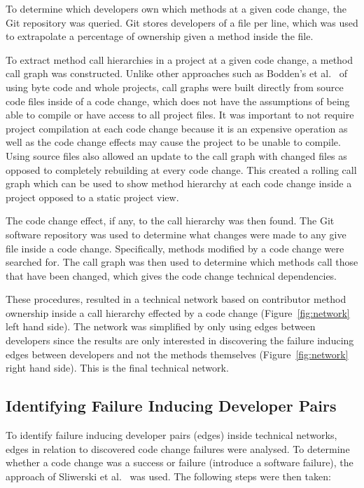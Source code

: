 \documentclass[conference]{IEEEtran}
\begin{document}
To determine which developers own which methods at a given code change,
the Git repository was queried. Git stores developers of a file per line, which was used to extrapolate
a percentage of ownership given a method inside the file.

To extract method call hierarchies in a project at a given code change,
a method call graph was constructed. Unlike other approaches such as Bodden's et al.~\cite{Bodden:2003:HVJ} 
of using byte code and whole projects, call graphs were built directly from source code files
inside of a code change, 
which does not have the assumptions of being able to compile or have access to all project 
files. It was important to not require project compilation at each code change because it is
an expensive operation as well as the code change effects may cause the project
to be unable to compile. Using source files also allowed an update to the call graph
with changed files as opposed to completely rebuilding at 
every code change. This created a rolling call graph which 
can be used to show method hierarchy at each code change inside a project opposed to
a static project view.

The code change effect, if any, to the call hierarchy was then found. The Git
software repository was used to determine what changes were made to any give file inside a 
code change. Specifically, methods modified by a code change were searched for. The call graph 
was then used to determine which methods call those that have been changed, which
gives the code change technical dependencies.

These procedures, resulted in a technical network based on contributor method ownership 
inside a call hierarchy effected by a code change (Figure~\ref{fig:network} left hand side).
The network was simplified by only using edges between developers since the results
are only interested in discovering the failure inducing edges between developers and not the 
methods themselves (Figure~\ref{fig:network} right hand side). This is the final technical 
network.

\subsection{Identifying Failure Inducing Developer Pairs}
To identify failure inducing developer pairs (edges) inside technical networks, 
edges in relation to discovered code change failures were analysed. To determine whether a code change 
was a success or failure (introduce a software failure), the approach of
Sliwerski et al.~\cite{Sliwerski:2005:CIF} was used. The following steps were then taken:
\end{document}
